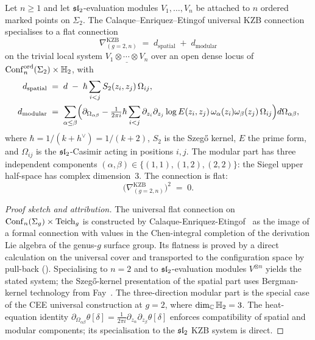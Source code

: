 \begin{theorem}
\label{thm:genus-2-kzb-connection-platonic}
Let $n\ge 1$ and let $\mathfrak{sl}_2$-evaluation modules $V_1,\ldots,V_n$
be attached to $n$ ordered marked points on $\Sigma_2$. The
Calaque--Enriquez--Etingof universal
KZB connection~\cite{CEE09} specialises to a flat connection
\begin{equation}\label{eq:g2p-kzb-flat}
 \nabla^{\mathrm{KZB}}_{(g=2,n)} \;=\;
 d_{\mathrm{spatial}} \;+\;
 d_{\mathrm{modular}}
\end{equation}
on the trivial local system
$\underline{V_1\otimes\cdots\otimes V_n}$
over an open dense locus of
$\mathrm{Conf}_n^{\mathrm{ord}}(\Sigma_2)\times\mathbb{H}_2$, with
\begin{align}
 d_{\mathrm{spatial}}
 &\;=\; d \;-\; \hbar \sum_{i<j} S_2(z_i,z_j)\,\Omega_{ij},
 \label{eq:g2p-kzb-spatial} \\
 d_{\mathrm{modular}}
 &\;=\; \sum_{\alpha\le \beta}
 \Bigl(\partial_{\Omega_{\alpha\beta}}
 -\tfrac{1}{2\pi i}\hbar\sum_{i<j}
 \partial_{z_i}\partial_{z_j}\log E(z_i,z_j)\,
 \omega_\alpha(z_i)\omega_\beta(z_j)\,\Omega_{ij}\Bigr)
 d\Omega_{\alpha\beta},
 \label{eq:g2p-kzb-modular}
\end{align}
where $\hbar = 1/(k+h^\vee) = 1/(k+2)$, $S_2$ is the Szeg\H{o}
kernel, $E$ the prime form, and $\Omega_{ij}$ is the
$\mathfrak{sl}_2$-Casimir acting in positions $i,j$.
The modular part has three independent components
$(\alpha,\beta)\in\{(1,1),(1,2),(2,2)\}$: the Siegel upper
half-space has complex dimension~$3$. The connection is flat:
\begin{equation}\label{eq:g2p-flatness}
 \bigl(\nabla^{\mathrm{KZB}}_{(g=2,n)}\bigr)^2 \;=\; 0.
\end{equation}
\end{theorem}

\begin{proof}[Proof sketch and attribution]
The universal flat connection on
$\mathrm{Conf}_n(\Sigma_g)\times\mathrm{Teich}_g$ is constructed by
Calaque-Enriquez-Etingof~\cite{CEE09} as the image of a formal
connection with values in the Chen-integral completion of the
derivation Lie algebra of the genus-$g$ surface group. Its
flatness is proved by a direct calculation on the universal
cover and transported to the configuration space by
pull-back (\cite[Theorems 9.3, 9.11]{CEE09}). Specialising to
$n=2$ and to $\mathfrak{sl}_2$-evaluation
modules $V^{\otimes n}$ yields the stated system; the
Szeg\H{o}-kernel presentation of the spatial part uses
Bergman-kernel technology from
Fay~\cite[Ch.~1]{Fay73}. The three-direction modular part is
the special case of the CEE universal construction at $g=2$,
where $\dim_{\mathbb{C}}\mathbb{H}_2 = 3$. The heat-equation identity
$\partial_{\Omega_{\alpha\beta}}\theta[\delta]
= \tfrac{1}{2\pi i}\partial_{z_\alpha}\partial_{z_\beta}
\theta[\delta]$ enforces compatibility of spatial and modular
components; its specialisation to the $\mathfrak{sl}_2$ KZB system is
direct.
\end{proof}

